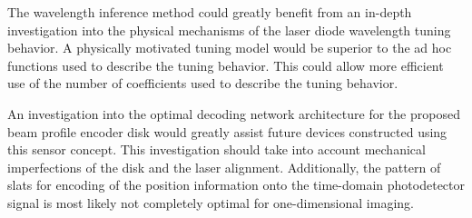 \documentclass[12pt]{report}
\begin{document}
	The wavelength inference method could greatly benefit from an in-depth investigation into the physical mechanisms of the laser diode wavelength tuning behavior. A physically motivated tuning model would be superior to the ad hoc functions used to describe the tuning behavior. This could allow more efficient use of the number of coefficients used to describe the tuning behavior.
	
	An investigation into the optimal decoding network architecture for the proposed beam profile encoder disk would greatly assist future devices constructed using this sensor concept. This investigation should take into account mechanical imperfections of the disk and the laser alignment. Additionally, the pattern of slats for encoding of the position information onto the time-domain photodetector signal is most likely not completely optimal for one-dimensional imaging. 
	
	\cleardoublepage

	
	
	\renewcommand{\bibname}{REFERENCES}
	

	\begin{appendices}
		\renewcommand{\appendixname}{APPENDIX}
		
		
		
	\end{appendices}
\end{document}

